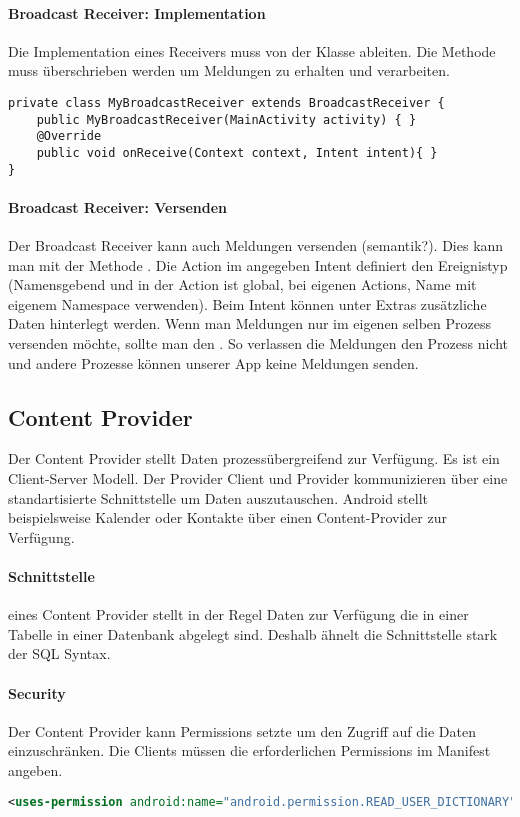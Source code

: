 \paragraph{Broadcast Receiver: Implementation} Die Implementation eines Receivers muss von der Klasse  ableiten. Die Methode  muss überschrieben werden um Meldungen zu erhalten und verarbeiten.
\begin{lstlisting}
private class MyBroadcastReceiver extends BroadcastReceiver {
    public MyBroadcastReceiver(MainActivity activity) { }
    @Override
    public void onReceive(Context context, Intent intent){ }
}
\end{lstlisting}
\paragraph{Broadcast Receiver: Versenden} Der Broadcast Receiver kann auch Meldungen versenden (semantik?). Dies kann man mit der Methode . Die Action im angegeben Intent definiert den Ereignistyp (Namensgebend und in der Action ist global, bei eigenen Actions, Name mit eigenem Namespace verwenden). Beim Intent können unter Extras zusätzliche Daten hinterlegt werden. Wenn man Meldungen nur im eigenen selben Prozess versenden möchte, sollte man den . So verlassen die Meldungen den Prozess nicht und andere Prozesse können unserer App keine Meldungen senden.
\subsection{Content Provider}
Der Content Provider stellt Daten prozessübergreifend zur Verfügung. Es ist ein Client-Server Modell. Der Provider Client und Provider kommunizieren über eine standartisierte Schnittstelle um Daten auszutauschen. Android stellt beispielsweise Kalender oder Kontakte über einen Content-Provider zur Verfügung.
\paragraph{Schnittstelle} eines Content Provider stellt in der Regel Daten zur Verfügung die in einer Tabelle in einer Datenbank abgelegt sind. Deshalb ähnelt die Schnittstelle stark der SQL Syntax.\\
\paragraph{Security} Der Content Provider kann Permissions setzte um den Zugriff auf die Daten einzuschränken. Die Clients müssen die erforderlichen Permissions im Manifest angeben.
\begin{lstlisting}[language=xml]
<uses-permission android:name="android.permission.READ_USER_DICTIONARY"/>
\end{lstlisting}
